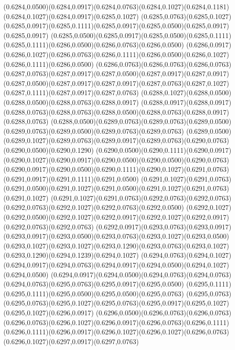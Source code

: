 (0.6284,0.0500)(0.6284,0.0917)(0.6284,0.0763)(0.6284,0.1027)(0.6284,0.1181)(0.6284,0.1027)(0.6284,0.0917)(0.6285,0.1027)
(0.6285,0.0763)(0.6285,0.1027)(0.6285,0.0917)(0.6285,0.1111)(0.6285,0.0917)(0.6285,0.0500)(0.6285,0.0917)(0.6285,0.0917)
(0.6285,0.0500)(0.6285,0.0917)(0.6285,0.0500)(0.6285,0.1111)(0.6285,0.1111)(0.6286,0.0500)(0.6286,0.0763)(0.6286,0.0500)
(0.6286,0.0917)(0.6286,0.1027)(0.6286,0.0763)(0.6286,0.1111)(0.6286,0.0500)(0.6286,0.1027)(0.6286,0.1111)(0.6286,0.0500)
(0.6286,0.0763)(0.6286,0.0763)(0.6286,0.0763)(0.6287,0.0763)(0.6287,0.0917)(0.6287,0.0500)(0.6287,0.0917)(0.6287,0.0917)
(0.6287,0.0500)(0.6287,0.0917)(0.6287,0.0917)(0.6287,0.0763)(0.6287,0.1027)(0.6287,0.1111)(0.6287,0.0917)(0.6287,0.0763)
(0.6288,0.1027)(0.6288,0.0500)(0.6288,0.0500)(0.6288,0.0763)(0.6288,0.0917)
\PST@Solid(0.6288,0.0917)(0.6288,0.0917)(0.6288,0.0763)(0.6288,0.0763)(0.6288,0.0500)(0.6288,0.0763)(0.6288,0.0917)(0.6288,0.0763)
(0.6288,0.0500)(0.6289,0.0763)(0.6289,0.0763)(0.6289,0.0500)(0.6289,0.0763)(0.6289,0.0500)(0.6289,0.0763)(0.6289,0.0763)
(0.6289,0.0500)(0.6289,0.1027)(0.6289,0.0763)(0.6289,0.0917)(0.6289,0.0763)(0.6290,0.0763)(0.6290,0.0500)(0.6290,0.1290)
(0.6290,0.0500)(0.6290,0.1111)(0.6290,0.0917)(0.6290,0.1027)(0.6290,0.0917)(0.6290,0.0500)(0.6290,0.0500)(0.6290,0.0763)
(0.6290,0.0917)(0.6290,0.0500)(0.6290,0.1111)(0.6290,0.1027)(0.6291,0.0763)(0.6291,0.0917)(0.6291,0.1111)(0.6291,0.0500)
(0.6291,0.1027)(0.6291,0.0763)(0.6291,0.0500)(0.6291,0.1027)(0.6291,0.0500)(0.6291,0.1027)(0.6291,0.0763)(0.6291,0.1027)
(0.6291,0.1027)(0.6291,0.0763)(0.6292,0.0763)(0.6292,0.0763)(0.6292,0.0763)(0.6292,0.1027)(0.6292,0.0763)(0.6292,0.0500)
(0.6292,0.1027)(0.6292,0.0500)(0.6292,0.1027)(0.6292,0.0917)(0.6292,0.1027)(0.6292,0.0917)(0.6292,0.0763)(0.6292,0.0763)
(0.6292,0.0917)(0.6293,0.0763)(0.6293,0.0917)(0.6293,0.0917)(0.6293,0.0500)(0.6293,0.0763)(0.6293,0.1027)(0.6293,0.0500)
(0.6293,0.1027)(0.6293,0.1027)(0.6293,0.1290)(0.6293,0.0763)(0.6293,0.1027)(0.6293,0.1290)(0.6294,0.1239)(0.6294,0.1027)
(0.6294,0.0763)(0.6294,0.1027)(0.6294,0.0917)(0.6294,0.0763)(0.6294,0.0917)(0.6294,0.0500)(0.6294,0.1027)(0.6294,0.0500)
(0.6294,0.0917)(0.6294,0.0500)(0.6294,0.0763)(0.6294,0.0763)(0.6294,0.0763)(0.6295,0.0763)(0.6295,0.0917)(0.6295,0.0500)
(0.6295,0.1111)(0.6295,0.1111)(0.6295,0.0500)(0.6295,0.0500)(0.6295,0.0763)
\PST@Solid(0.6295,0.0763)(0.6295,0.0763)(0.6295,0.1027)(0.6295,0.0763)(0.6295,0.0917)(0.6295,0.1027)(0.6295,0.1027)(0.6296,0.0917)
(0.6296,0.0500)(0.6296,0.0763)(0.6296,0.0763)(0.6296,0.0763)(0.6296,0.1027)(0.6296,0.0917)(0.6296,0.0763)(0.6296,0.1111)
(0.6296,0.1111)(0.6296,0.0917)(0.6296,0.1027)(0.6296,0.1027)(0.6296,0.0763)(0.6296,0.1027)(0.6297,0.0917)(0.6297,0.0763)
